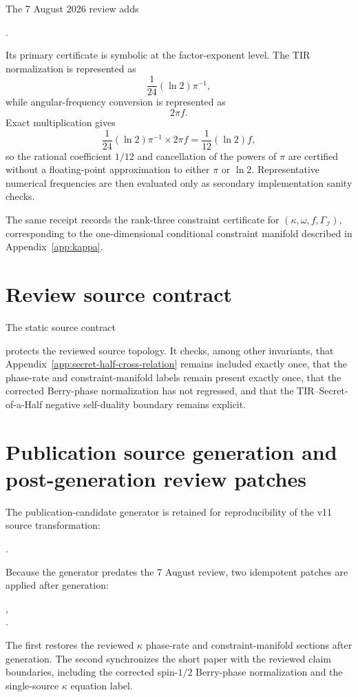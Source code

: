 The 7 August 2026 review adds
\begin{center}
.
\end{center}
Its primary certificate is symbolic at the factor-exponent level.  The TIR
normalization is represented as
\[
\frac1{24}(\ln2)\pi^{-1},
\]
while angular-frequency conversion is represented as
\[
2\pi f.
\]
Exact multiplication gives
\[
\boxed{
\frac1{24}(\ln2)\pi^{-1}\times 2\pi f
=\frac1{12}(\ln2)f
},
\]
so the rational coefficient $1/12$ and cancellation of the powers of $\pi$ are
certified without a floating-point approximation to either $\pi$ or $\ln2$.
Representative numerical frequencies are then evaluated only as secondary
implementation sanity checks.

The same receipt records the rank-three constraint certificate for
$(\kappa,\omega,f,\Gamma_{\mathcal I})$, corresponding to the one-dimensional
conditional constraint manifold described in Appendix~\ref{app:kappa}.

\section{Review source contract}

The static source contract
\begin{center}
\end{center}
protects the reviewed source topology.  It checks, among other invariants, that
Appendix~\ref{app:secret-half-cross-relation} remains included exactly once,
that the phase-rate and constraint-manifold labels remain present exactly once,
that the corrected Berry-phase normalization has not regressed, and that the
TIR--Secret-of-a-Half negative self-duality boundary remains explicit.

\section{Publication source generation and post-generation review patches}

The publication-candidate generator is retained for reproducibility of the v11
source transformation:
\begin{center}
.
\end{center}
Because the generator predates the 7 August review, two idempotent patches are
applied after generation:
\begin{center}
,\\
.
\end{center}
The first restores the reviewed $\kappa$ phase-rate and constraint-manifold
sections after generation.  The second synchronizes the short paper with the
reviewed claim boundaries, including the corrected spin-$1/2$ Berry-phase
normalization and the single-source $\kappa$ equation label.

